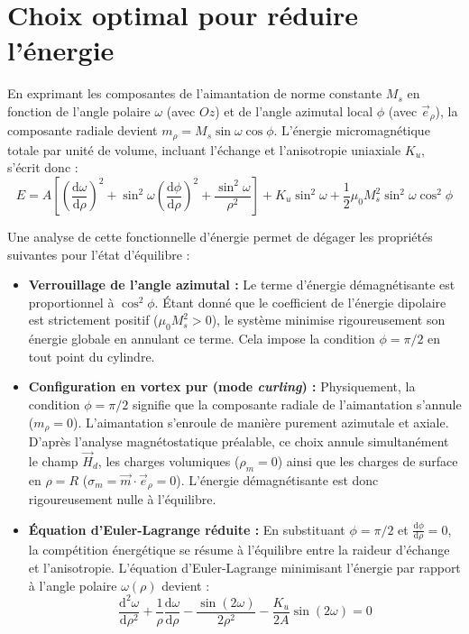 \documentclass[11pt,a4paper]{article}
\begin{document}
\section*{Choix optimal pour réduire l'énergie}

En exprimant les composantes de l'aimantation de norme constante $M_s$ en fonction de l'angle polaire $\omega$ (avec $Oz$) et de l'angle azimutal local $\phi$ (avec $\vec{e}_\rho$), la composante radiale devient $m_\rho = M_s \sin\omega \cos\phi$. L'énergie micromagnétique totale par unité de volume, incluant l'échange et l'anisotropie uniaxiale $K_u$, s'écrit donc :
\begin{equation}
    E = A \left[ \left(\frac{\text{d}\omega}{\text{d}\rho}\right)^2 + \sin^2\omega \left(\frac{\text{d}\phi}{\text{d}\rho}\right)^2 + \frac{\sin^2\omega}{\rho^2} \right] + K_u \sin^2\omega + \frac{1}{2}\mu_0 M_s^2 \sin^2\omega \cos^2\phi
\end{equation}

Une analyse de cette fonctionnelle d'énergie permet de dégager les propriétés suivantes pour l'état d'équilibre :
\begin{itemize}
    \item \textbf{Verrouillage de l'angle azimutal :} Le terme d'énergie démagnétisante est proportionnel à $\cos^2\phi$. Étant donné que le coefficient de l'énergie dipolaire est strictement positif ($\mu_0 M_s^2 > 0$), le système minimise rigoureusement son énergie globale en annulant ce terme. Cela impose la condition \textbf{$\phi = \pi/2$} en tout point du cylindre.
    \item \textbf{Configuration en vortex pur (mode \textit{curling}) :} Physiquement, la condition $\phi = \pi/2$ signifie que la composante radiale de l'aimantation s'annule ($m_\rho = 0$). L'aimantation s'enroule de manière purement azimutale et axiale. D'après l'analyse magnétostatique préalable, ce choix annule simultanément le champ $\vec{H}_d$, les charges volumiques ($\rho_m = 0$) ainsi que les charges de surface en $\rho = R$ ($\sigma_m = \vec{m} \cdot \vec{e}_\rho = 0$). L'énergie démagnétisante est donc rigoureusement nulle à l'équilibre.
    \item \textbf{Équation d'Euler-Lagrange réduite :} En substituant $\phi = \pi/2$ et $\frac{\text{d}\phi}{\text{d}\rho} = 0$, la compétition énergétique se résume à l'équilibre entre la raideur d'échange et l'anisotropie. L'équation d'Euler-Lagrange minimisant l'énergie par rapport à l'angle polaire $\omega(\rho)$ devient :
    \begin{equation}
        \frac{\text{d}^2\omega}{\text{d}\rho^2} + \frac{1}{\rho}\frac{\text{d}\omega}{\text{d}\rho} - \frac{\sin(2\omega)}{2\rho^2} - \frac{K_u}{2A}\sin(2\omega) = 0
    \end{equation}
\end{itemize}
\end{document}
